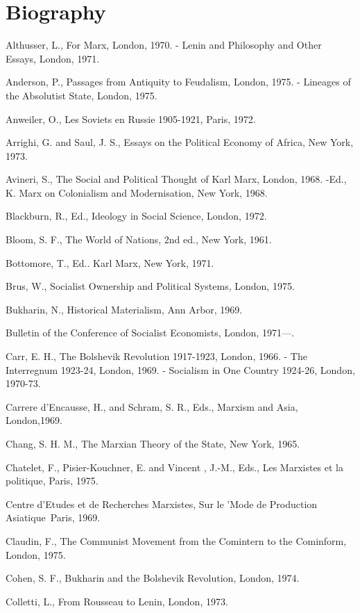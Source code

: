 \chapter*{Biography}


Althusser, L., For Marx, London, 1970.
- Lenin and Philosophy and Other Essays, London, 1971.

Anderson, P., Passages from Antiquity to Feudalism, London, 1975.
- Lineages of the Absolutist State, London, 1975.

Anweiler, O., Les Soviets en Russie 1905-1921, Paris, 1972.

Arrighi, G. and Saul, J. S., Essays on the Political Economy of Africa, New York, 1973.

Avineri, S., The Social and Political Thought of Karl Marx, London, 1968.
-Ed., K. Marx on Colonialism and Modernisation, New York, 1968.

Blackburn, R., Ed., Ideology in Social Science, London, 1972.

Bloom, S. F., The World of Nations, 2nd ed., New York, 1961.

Bottomore, T., Ed.. Karl Marx, New York, 1971.

Brus, W., Socialist Ownership and Political Systems, London, 1975.

Bukharin, N., Historical Materialism, Ann Arbor, 1969.

Bulletin of the Conference of Socialist Economists, London, 1971—.

Carr, E. H., The Bolshevik Revolution 1917-1923, London, 1966.
- The Interregnum 1923-24, London, 1969.
- Socialism in One Country 1924-26, London, 1970-73.

Carrere d'Encausse, H., and Schram, S. R., Eds., Marxism and Asia, London,1969.

Chang, S. H. M., The Marxian Theory of the State, New York, 1965.

Chatelet, F., Pisier-Kouchner, E. and Vincent , J.-M., Eds., Les Marxistes et la politique, Paris, 1975.

Centre d'Etudes et de Recherches Marxistes, Sur le 'Mode de Production Asiatique\ Paris, 1969.

Claudin, F., The Communist Movement from the Comintern to the Cominform, London, 1975.

Cohen, S. F., Bukharin and the Bolshevik Revolution, London, 1974.

Colletti, L., From Rousseau to Lenin, London, 1973.

